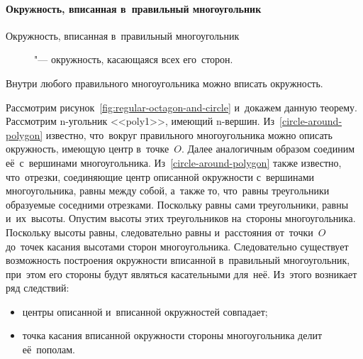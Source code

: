 \documentclass[]{scrartcl}
\begin{document}
\paragraph{Окружность, вписанная в~правильный многоугольник}
\begin{description}
	\item[Окружность, вписанная в~правильный многоугольник] "--- окружность, касающаяся всех его~сторон.
\end{description}
\begin{theorem}
	Внутри любого правильного многоугольника можно вписать окружность.
\end{theorem}
Рассмотрим рисунок~\ref{fig:regular-octagon-and-circle} и~докажем данную теорему. Рассмотрим n-угольник <<poly1>>, имеющий n-вершин. Из~\ref{circle-around-polygon} известно, что~вокруг правильного многоугольника можно описать окружность, имеющую центр в~точке~${\textstyle O}$. Далее аналогичным образом соединим её~с~вершинами многоугольника. Из~\ref{circle-around-polygon} также известно, что~отрезки, соединяющие центр описанной окружности с~вершинами многоугольника, равны между собой, а~также то, что~равны треугольники образуемые соседними отрезками. Поскольку равны сами треугольники, равны и~их~высоты. Опустим высоты этих треугольников на~стороны многоугольника. Поскольку высоты равны, следовательно равны и~расстояния от~точки~${\textstyle O}$ до~точек касания высотами сторон многоугольника. Следовательно существует возможность построения окружности вписанной в~правильный многоугольник, при~этом его стороны будут являться касательными для~неё. Из~этого возникает ряд следствий:
\begin{itemize}
	\item центры описанной и~вписанной окружностей совпадает;
	\item точка касания вписанной окружности стороны многоугольника делит её~пополам.
\end{itemize}
\end{document}
